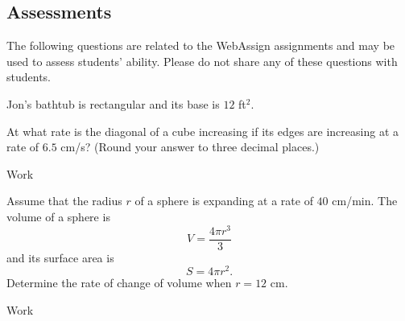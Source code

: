 \documentclass[12pt,addpoints, answers, fleqn]{exam}
\begin{document}
\begin{teacher}
\subsection{Assessments}
The following questions are related to the WebAssign assignments and may be used to assess students' ability. Please do not share any of these questions with students.
\begin{questions}	
	
\question 	%

Jon's bathtub is rectangular and its base is $12$ ft$^2$.

\question 	%

At what rate is the diagonal of a cube increasing if its edges are increasing at a rate of $6.5$ cm/s? (Round your answer to three decimal places.)
\begin{solution}
Work
\end{solution}

\question 	%

Assume that the radius $r$ of a sphere is expanding at a rate of $40$ cm/min. The volume of a sphere is
\[
V = \frac{4\pi r^3}{3}
\]
and its surface area is
\[
S= 4\pi r^2.
\]
Determine the rate of change of volume when $r = 12$ cm.
 \begin{solution}
Work
\end{solution}


\question 	%


\end{questions}
\end{teacher}
\end{document}

